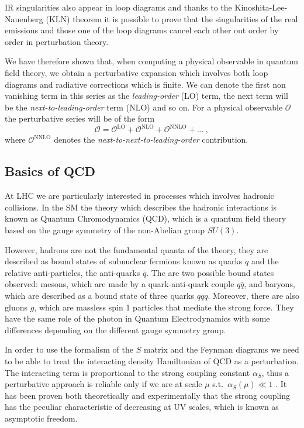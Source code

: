 \documentclass[../main/main.tex]{subfiles}
\begin{document}
IR singularities also appear in loop diagrams and thanks to the Kinoshita-Lee-Nauenberg (KLN) theorem it is possible to prove that the singularities of the real emissions and those one of the loop diagrams cancel each other out  order by order in perturbation theory.

We have therefore shown that, when computing a physical observable in quantum field theory, we obtain a perturbative expansion which 
involves both loop diagrams and radiative corrections which is finite. We can denote the first non vanishing term in this series as the 
\emph{leading-order} (LO) term, the next term will be the \emph{next-to-leading-order} term (NLO) and so on.
For a physical observable $\mathcal{O}$ the perturbative series will be of the form
\begin{equation}
	\mathcal{O} = \mathcal{O}^{\text{LO}}+\mathcal{O}^{\text{NLO}}+ \mathcal{O}^{\text{NNLO}} + \dots  \ ,
\end{equation}
	where $ \mathcal{O}^{\text{NNLO}}$ denotes the \emph{next-to-next-to-leading-order }contribution.

\subsection{Basics of QCD}
At LHC we are particularly interested in processes which involves hadronic collisions. In the SM the theory which describes the hadronic interactions is known as Quantum 
Chromodynamics (QCD), which is a quantum field theory based on the gauge symmetry of the non-Abelian group $SU(3)$.

However, hadrons are not the fundamental quanta of the theory, they are described as bound states of subnuclear fermions known as quarks $q$ and the relative anti-particles, the anti-quarks $\bar{q}$. The 
are two possible bound states observed: mesons, which are made by a quark-anti-quark couple $q\bar{q}$, 
and baryons, which are described as a bound state of three quarks $qqq$. Moreover, there are also gluons $g$, which are massless spin 1 particles that mediate the strong force. They have the same role of the photon in Quantum Electrodynamics with some differences depending on the different gauge symmetry group.

In order to use the formalism of the $S$ matrix and the Feynman diagrams we need to be able to treat the interacting density Hamiltonian of QCD as 
a perturbation. The interacting term is proportional to the strong coupling constant $\alpha_S$, thus a perturbative approach is reliable only 
if we are at scale $\mu $ s.t.\ $\alpha_S(\mu)  \ll 1$ . It has been proven both theoretically and experimentally that the strong coupling has the peculiar characteristic of decreasing at UV scales, which is known as asymptotic freedom.
\end{document}
